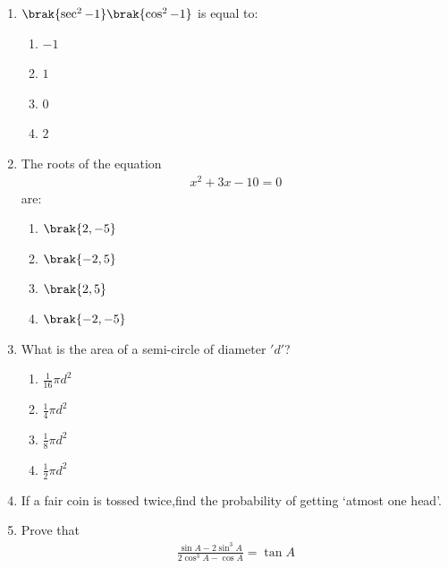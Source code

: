 %
\begin{enumerate}
    \item $\brak{\sec^2-1}\brak{\cos^2-1}$ is equal to:
    \begin{enumerate}
    \item $-1$
    \item $1$
    \item $0$
    \item $2$
    \end{enumerate}

    \item The roots of the equation 
    \begin{align}
        x^2+3x-10=0
    \end{align}
    are:
    \begin{enumerate}
        \item $\brak{2,-5}$ \item $\brak{-2,5}$ \item $\brak{2,5}$  \item $\brak{-2,-5}$
    \end{enumerate}

    \item What is the area of a semi-circle of diameter $'d'$?
    
    \begin{enumerate}
        \item $\frac{1}{16}\pi d^2$ \item $\frac{1}{4}\pi d^2$ \item $\frac{1}{8}\pi d^2$ \item $\frac{1}{2}\pi d^2$
    \end{enumerate}


    \item If a fair coin is tossed twice,find the probability of getting `atmost one head'.

     \item Prove that 
    \begin{align}
        \frac{\sin A-2\sin^3 A}{2 \cos^3 A-\cos A}=\tan A
    \end{align}


\end{enumerate}
